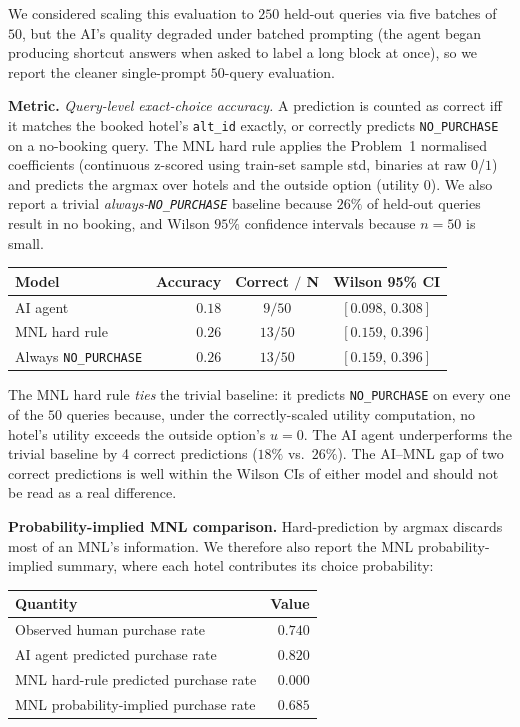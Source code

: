 \documentclass[11pt]{article}
\begin{document}
We considered scaling this evaluation to $250$ held-out queries via
five batches of $50$, but the AI's quality degraded under batched
prompting (the agent began producing shortcut answers when asked to
label a long block at once), so we report the cleaner single-prompt
$50$-query evaluation.

\medskip
\noindent\textbf{Metric.} \emph{Query-level exact-choice accuracy.}
A prediction is counted as correct iff it matches the booked hotel's
\texttt{alt\_id} exactly, or correctly predicts \texttt{NO\_PURCHASE}
on a no-booking query. The MNL hard rule applies the Problem~1
normalised coefficients (continuous z-scored using train-set sample
std, binaries at raw $0$/$1$) and predicts the argmax over hotels and
the outside option (utility $0$). We also report a trivial
\emph{always-\texttt{NO\_PURCHASE}} baseline because $26\%$ of
held-out queries result in no booking, and Wilson $95\%$ confidence
intervals because $n = 50$ is small.

\begin{center}
\begin{tabular}{lrcc}
\toprule
Model & Accuracy & Correct $/$ N & Wilson 95\% CI \\
\midrule
AI agent                       & $0.18$ & $9 / 50$  & $[0.098,\,0.308]$ \\
MNL hard rule                  & $0.26$ & $13 / 50$ & $[0.159,\,0.396]$ \\
Always \texttt{NO\_PURCHASE}   & $0.26$ & $13 / 50$ & $[0.159,\,0.396]$ \\
\bottomrule
\end{tabular}
\end{center}

The MNL hard rule \emph{ties} the trivial baseline: it predicts
\texttt{NO\_PURCHASE} on every one of the $50$ queries because, under
the correctly-scaled utility computation, no hotel's utility exceeds
the outside option's $u = 0$. The AI agent underperforms the trivial
baseline by 4 correct predictions ($18\%$ vs.\ $26\%$). The
AI--MNL gap of two correct predictions is well within the Wilson CIs
of either model and should not be read as a real difference.

\medskip
\noindent\textbf{Probability-implied MNL comparison.}
Hard-prediction by argmax discards most of an MNL's information.
We therefore also report the MNL probability-implied summary, where
each hotel contributes its choice probability:

\begin{center}
\begin{tabular}{lr}
\toprule
Quantity & Value \\
\midrule
Observed human purchase rate                       & $0.740$ \\
AI agent predicted purchase rate                   & $0.820$ \\
MNL hard-rule predicted purchase rate              & $0.000$ \\
MNL probability-implied purchase rate              & $0.685$ \\
\bottomrule
\end{tabular}
\end{center}
\end{document}
